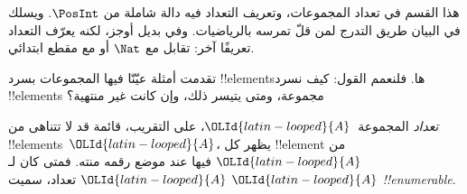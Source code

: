 \documentclass[../../../include/open-logic-section]{subfiles}
\begin{document}


\begin{editorial}
هذا القسم في تعداد المجموعات، وتعريف التعداد فيه دالة شاملة من
$\PosInt$. ويسلك في البيان طريق التدرج لمن قلّ تمرسه بالرياضيات.
وفي  بديل أوجز، لكنه يعرّف التعداد تعريفًا
آخر: تقابل مع $\Nat$ أو مع مقطع ابتدائي.
\end{editorial}

\begin{explain}
تقدمت أمثلة عيّنّا فيها المجموعات بسرد !!{element}sها.
فلنعمم القول: كيف نسرد !!{element}s مجموعة، ومتى يتيسر ذلك،
وإن كانت غير منتهية؟
\end{explain}

\begin{defn}
\emph{تعداد} المجموعة~${\OLId{latin-looped}{A}}$، على التقريب، قائمة قد لا تتناهى من
!!{element}s~${\OLId{latin-looped}{A}}$، يظهر كل !!{element} من ${\OLId{latin-looped}{A}}$ فيها عند موضع
رقمه منته. فمتى كان لـ${\OLId{latin-looped}{A}}$ تعداد، سميت ${\OLId{latin-looped}{A}}$ \emph{!!{enumerable}}.
\end{defn}
\end{document}
